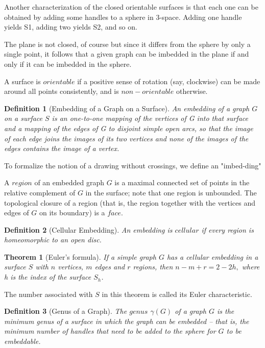 \documentclass[10pt]{article}
\newtheorem{definition}{Definition}
\newtheorem{theorem}{Theorem}
\begin{document}
Another characterization of the closed orientable surfaces is that each one can be obtained by adding some handles to a  sphere in 3-space. Adding one handle yields S1, adding two yields S2, and so on.


 The plane is not closed, of course but since it differs from the sphere by only a single point, it follows that a given graph can be imbedded in the plane if and only if it can be imbedded in the sphere. 
 
 

A surface is $orientable$ if a positive sense of rotation (say, clockwise) can be made around all points consistently, and is $non-orientable$ otherwise.

\begin{definition}[Embedding of a Graph on a Surface]
An embedding of a graph $G$ on a surface $S$ is an one-to-one mapping of the vertices of G into that surface and a mapping of the edges of G to disjoint simple open arcs, so that the image of each edge joins the images of its two vertices and none of the images of the edges contains the image of a vertex.
\end{definition}
To formalize the notion of a drawing without crossings, we define an "imbed-ding"

A $region$ of an embedded graph $G$ is a maximal connected set of points in the relative complement of $G$ in the surface; note that one region is unbounded. The topological closure of a region (that is, the region together with the vertices and edges of $G$ on its boundary) is a $face$.

\begin{definition}[Cellular Embedding]
 An embedding is $cellular$ if every region is homeomorphic to an open disc.
\end{definition}

\begin{theorem}[Euler’s formula]
    If a simple graph $G$ has a cellular embedding in a surface $S$ with $n$ vertices, $m$ edges and $r$ regions, then
    $n-m+r=2-2h,$ where h is the index of the surface $S_h$.
\end{theorem}

The number associated with $S$ in this theorem is called its Euler characteristic.

\begin{definition} [Genus of a Graph]
The $genus$ $\gamma(G)$ of a graph $G$ is the minimum genus of a surface in which the graph can be embedded – that is, the minimum number of handles that need to be added to the sphere for $G$ to be embeddable.
\end{definition}
\end{document}
